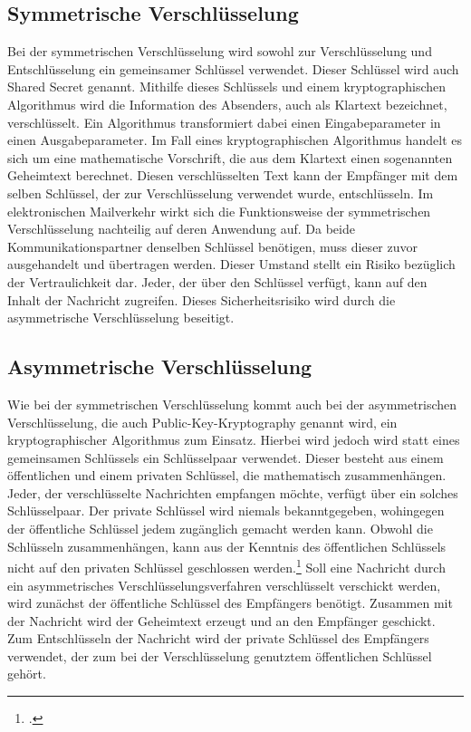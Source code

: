 \documentclass  [paper=a4,
				fontsize=12pt,
				listof=totoc,
				bibliography=totoc
				]{scrreprt}
\begin{document}
			\subsection{Symmetrische Verschlüsselung}
				Bei der symmetrischen Verschlüsselung wird sowohl zur Verschlüsselung und Entschlüsselung ein gemeinsamer Schlüssel verwendet. Dieser Schlüssel wird auch Shared Secret genannt. Mithilfe dieses Schlüssels und einem kryptographischen Algorithmus wird die Information des Absenders, auch als Klartext bezeichnet, verschlüsselt. Ein Algorithmus transformiert dabei einen Eingabeparameter in einen Ausgabeparameter. Im Fall eines kryptographischen Algorithmus handelt es sich um eine mathematische Vorschrift, die aus dem Klartext einen sogenannten Geheimtext berechnet. Diesen verschlüsselten Text kann der Empfänger mit dem selben Schlüssel, der zur Verschlüsselung verwendet wurde, entschlüsseln.
				Im elektronischen Mailverkehr wirkt sich die Funktionsweise der symmetrischen Verschlüsselung nachteilig auf deren Anwendung auf. Da beide Kommunikationspartner denselben Schlüssel benötigen, muss dieser zuvor ausgehandelt und übertragen werden. Dieser Umstand stellt ein Risiko bezüglich der Vertraulichkeit dar. Jeder, der über den Schlüssel verfügt, kann auf den Inhalt der Nachricht zugreifen. Dieses Sicherheitsrisiko wird durch die asymmetrische Verschlüsselung beseitigt.
			\subsection{Asymmetrische Verschlüsselung}
				Wie bei der symmetrischen Verschlüsselung kommt auch bei der asymmetrischen Verschlüsselung, die auch Public-Key-Kryptography genannt wird, ein kryptographischer Algorithmus zum Einsatz. Hierbei wird jedoch wird statt eines gemeinsamen Schlüssels ein Schlüsselpaar verwendet. Dieser besteht aus einem öffentlichen und einem privaten Schlüssel, die mathematisch zusammenhängen. Jeder, der verschlüsselte Nachrichten empfangen möchte, verfügt über ein solches Schlüsselpaar. Der private Schlüssel wird niemals bekanntgegeben, wohingegen der öffentliche Schlüssel jedem zugänglich gemacht werden kann. Obwohl die Schlüsseln zusammenhängen, kann aus der Kenntnis des öffentlichen Schlüssels nicht auf den privaten Schlüssel geschlossen werden.\footcite[S. 177]{Schmeh2013}
				Soll eine Nachricht durch ein asymmetrisches Verschlüsselungsverfahren verschlüsselt verschickt werden, wird zunächst der öffentliche Schlüssel des Empfängers benötigt. Zusammen mit der Nachricht wird der Geheimtext erzeugt und an den Empfänger geschickt. Zum Entschlüsseln der Nachricht wird der private Schlüssel des Empfängers verwendet, der zum bei der Verschlüsselung genutztem öffentlichen Schlüssel gehört.
				
\end{document}

